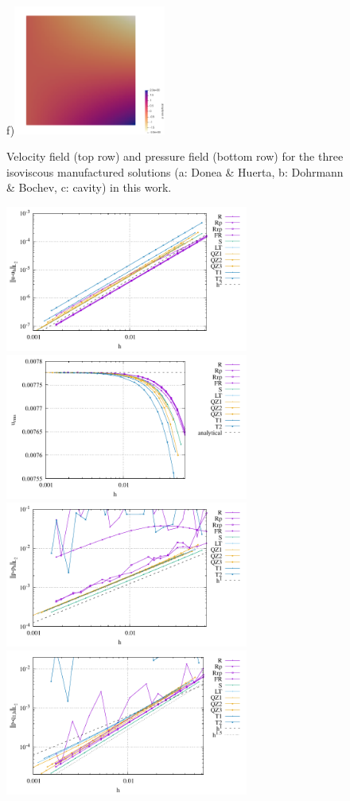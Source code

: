 \documentclass[a4paper,12pt]{article}
\begin{document}
\begin{figure}[t]
f)\includegraphics[width=5cm]{../images/fields/press_cavity}
\caption{Velocity field (top row) and pressure field (bottom 
row) for the three isoviscous manufactured solutions (a: Donea \& Huerta, 
b: Dohrmann \& Bochev, c: cavity) in this work. \label{fig:dh1}}
\end{figure}

\begin{figure}
\centering
\includegraphics[width=8cm]{../results/errors_u_exp1}
\includegraphics[width=8cm]{../results/vrms_exp1} \\
\includegraphics[width=8cm]{../results/errors_p_exp1}
\includegraphics[width=8cm]{../results/errors_q1_exp1}\\

\end{figure}
\end{document}
